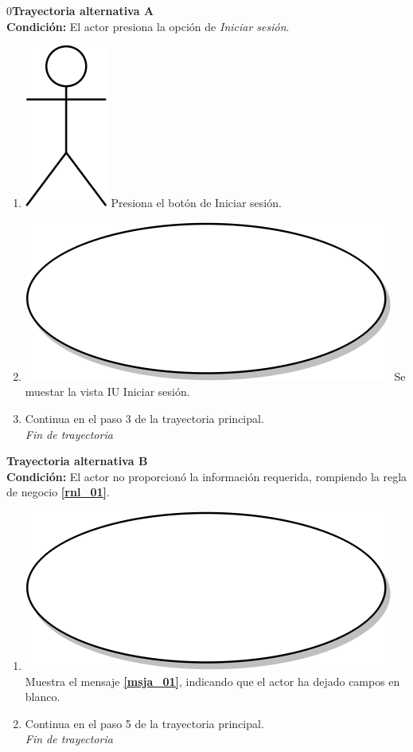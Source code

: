 0\textbf{Trayectoria alternativa A} \label{cu2_ta_a} \\
\textbf{Condición:} El actor presiona la opción de \textit{Iniciar sesión}.\\
 \begin{enumerate}[label=A\arabic*]
  \item {\includegraphics[scale=.1]{Capitulo3/img/actor.png} Presiona el botón de Iniciar sesión.}
  \item {\includegraphics[scale=.05]{Capitulo3/img/proceso.png} Se muestar la vista IU Iniciar sesión.}
    \item {Continua en el paso 3 de la trayectoria principal.} \\
    \textit{Fin de trayectoria} \\
\end{enumerate}

\textbf{Trayectoria alternativa B} \label{cu2_ta_b} \\
\textbf{Condición:} El actor no proporcionó la información requerida, rompiendo la regla de negocio \textbf{\ref{rnl_01}}.\\
 \begin{enumerate}[label=B\arabic*]
    \item {\includegraphics[scale=.05]{Capitulo3/img/proceso.png} Muestra el mensaje \textbf{\ref{msja_01}}, indicando que el actor ha dejado campos en blanco.}
    \item {Continua en el paso 5  de la trayectoria principal.} \\
    \textit{Fin de trayectoria} \\
\end{enumerate}

